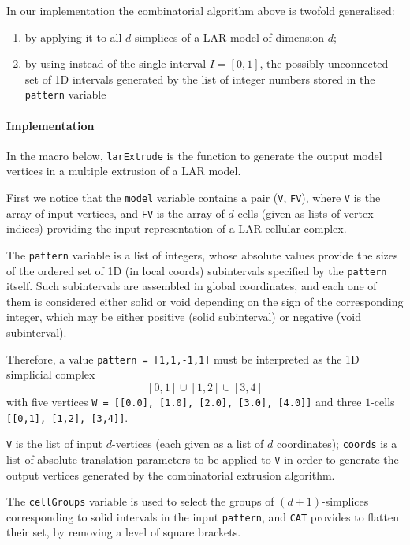 \documentclass[11pt,oneside]{article}	%
\begin{document}
In our implementation the combinatorial algorithm above is twofold generalised:
\begin{enumerate}
\item by applying it to all $d$-simplices of a LAR model of dimension $d$;
\item by using instead of the single interval $I=[0,1]$, the possibly unconnected set of 1D intervals generated by the list of integer numbers stored in the \texttt{pattern} variable
\end{enumerate}

\paragraph{Implementation}
In the macro below, \texttt{larExtrude} is the function to generate the output model vertices in a multiple extrusion of a LAR model.

First we notice that the \texttt{model} variable contains a pair (\texttt{V}, \texttt{FV}), where \texttt{V} is the array of input vertices, and \texttt{FV} is the array of $d$-cells (given as lists of vertex indices) providing the  input representation of a LAR cellular complex.

The \texttt{pattern} variable is a list of integers, whose absolute values provide the sizes of the ordered set of 1D (in local coords) subintervals specified by the \texttt{pattern} itself. Such subintervals are assembled in global coordinates, and each one of them is considered either solid or void depending on the sign of the corresponding integer, which may be either positive (solid subinterval) or negative (void subinterval).  

Therefore, a value \texttt{pattern = [1,1,-1,1]} must be interpreted as the 1D simplicial complex
\[
[0,1] \cup [1,2] \cup [3,4]
\]
with five vertices \texttt{W = [[0.0], [1.0], [2.0], [3.0], [4.0]]} and three $1$-cells \texttt{[[0,1], [1,2], [3,4]]}.

\texttt{V} is the list of input $d$-vertices (each given as a list of $d$ coordinates);
\texttt{coords} is a list of absolute translation parameters to be applied to \texttt{V} in order to generate the output vertices generated by the combinatorial extrusion algorithm.

The \texttt{cellGroups} variable is used to select the groups of $(d+1)$-simplices corresponding to solid intervals in the input \texttt{pattern}, and \texttt{CAT} provides to flatten their set, by removing a level of square brackets.
\end{document}

